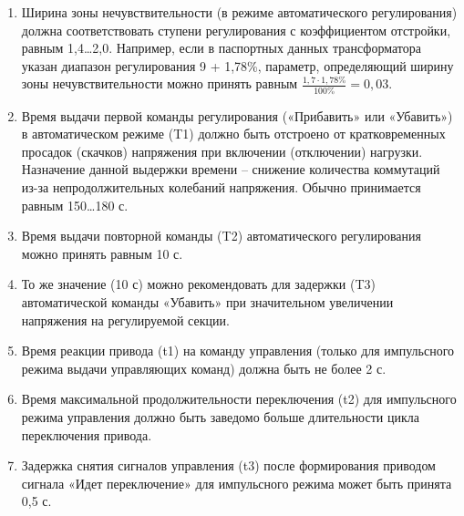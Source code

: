 \begin{enumerate}[label=\arabic{section}.\arabic{subsection}.\arabic*, labelsep=4pt, leftmargin=0pt, itemindent=57pt]
\item
Ширина  зоны  нечувствительности  (в  режиме  автоматического  регулирования)  должна соответствовать ступени регулирования с коэффициентом отстройки, равным 1,4…2,0. Например, если в 
паспортных  данных    трансформатора  указан  диапазон  регулирования  9  +  1,78\%,  параметр, определяющий ширину зоны нечувствительности можно принять равным $\frac{1,7 · 1,78\%}{100\%} = 0,03$.

\item
Время  выдачи  первой  команды  регулирования  («Прибавить»  или  «Убавить»)  в  автоматическом режиме (T1) должно быть отстроено от кратковременных просадок (скачков) напряжения при включении (отключении) нагрузки. Назначение данной выдержки времени – снижение количества коммутаций из-за непродолжительных колебаний напряжения. Обычно принимается равным 150…180 с.

\item
Время выдачи повторной команды (T2) автоматического регулирования можно принять равным 10 с.

\item
То же значение (10 с) можно рекомендовать для задержки (T3) автоматической команды «Убавить» при значительном увеличении напряжения на регулируемой секции.

\item
Время  реакции  привода  (t1)  на  команду  управления  (только  для  импульсного  режима  выдачи управляющих команд) должна быть не более 2 с.

\item
Время  максимальной продолжительности переключения (t2) для импульсного режима управления должно быть заведомо больше длительности цикла переключения привода. 

\item
Задержка  снятия  сигналов  управления  (t3)  после  формирования  приводом  сигнала  «Идет переключение» для импульсного режима может быть принята 0,5 с. 

\end{enumerate}




